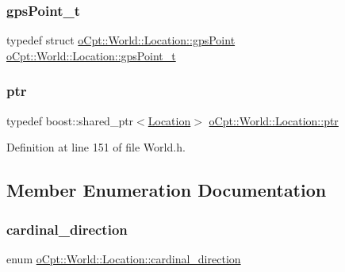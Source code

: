 \subsubsection{\texorpdfstring{gps\+Point\+\_\+t}{gpsPoint\_t}}
{\footnotesize\ttfamily typedef struct \hyperlink{structo_cpt_1_1_world_1_1_location_1_1gps_point}{o\+Cpt\+::\+World\+::\+Location\+::gps\+Point}  \hyperlink{classo_cpt_1_1_world_1_1_location_a3aa5e31e2888b4da40ad534b99473888}{o\+Cpt\+::\+World\+::\+Location\+::gps\+Point\+\_\+t}}

\hypertarget{classo_cpt_1_1_world_1_1_location_a33b7d6b8797958b6e4d792dfeaa6d160}{}\label{classo_cpt_1_1_world_1_1_location_a33b7d6b8797958b6e4d792dfeaa6d160} 
\subsubsection{\texorpdfstring{ptr}{ptr}}
{\footnotesize\ttfamily typedef boost\+::shared\+\_\+ptr$<$\hyperlink{classo_cpt_1_1_world_1_1_location}{Location}$>$ \hyperlink{classo_cpt_1_1_world_1_1_location_a33b7d6b8797958b6e4d792dfeaa6d160}{o\+Cpt\+::\+World\+::\+Location\+::ptr}}



Definition at line 151 of file World.\+h.



\subsection{Member Enumeration Documentation}
\hypertarget{classo_cpt_1_1_world_1_1_location_aa37d99a87b49ccc38470dcc6cc64ced5}{}\label{classo_cpt_1_1_world_1_1_location_aa37d99a87b49ccc38470dcc6cc64ced5} 
\subsubsection{\texorpdfstring{cardinal\+\_\+direction}{cardinal\_direction}}
{\footnotesize\ttfamily enum \hyperlink{classo_cpt_1_1_world_1_1_location_aa37d99a87b49ccc38470dcc6cc64ced5}{o\+Cpt\+::\+World\+::\+Location\+::cardinal\+\_\+direction}}

